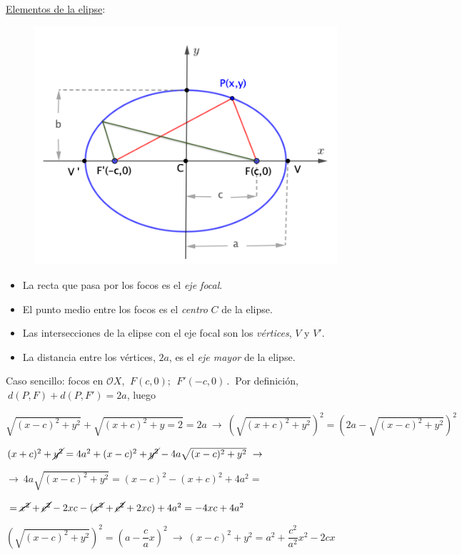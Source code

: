\vspace{4mm}
\begin{multicols}{2}
\underline{Elementos de la elipse}:
\begin{figure}[H]
	\centering
	\includegraphics[width=.5\textwidth]{img-conicas/conicas06.png}
	\end{figure}	
	\begin{itemize}
	\item La recta que pasa por los focos es el \emph{eje focal}.
	 

	\item El punto medio entre los focos es el \emph{centro} $C$ de la elipse.

	\item Las intersecciones de la elipse con el eje focal son los \emph{vértices}, $V$ y $V'$. 

	\item La distancia entre los vértices, $2a$, es el \emph{eje mayor} de la elipse.
	\end{itemize}
\end{multicols}

\vspace{4mm}

Caso sencillo: focos en $\mathcal OX$, $\ F(c,0);\ \ F'(-c,0)\, . \ $ Por definición, $\ d(P,F)+d(P,F')=2a$, luego

$\sqrt{(x-c)^2+y^2}+\sqrt{(x+c)^2+y=2}=2a \ \to \ (\sqrt{(x+c)^2+y^2})^2=(2a-\sqrt{(x-c)^2+y^2})^2$

$(x+c)^2 + \cancel{y^2} = 4a^2 + (x-c)^2 +\cancel{y^2} -4a\sqrt{(x-c)^2+y^2} \ \to \ $

$\to \ 4a\sqrt{(x-c)^2+y^2}=(x-c)^2-(x+c)^2+4a^2 =$ 

\hspace{35mm} $\, =\cancel{x^2}+\cancel{c^2}-2xc-(\cancel{x^2}+\cancel{c^2}+2xc)+4a^2=-4xc+4a^2$

$\left( \sqrt{(x-c)^2+y^2}\right)^2=\left( a-\dfrac c a x \right)^2 \ \to \ (x-c)^2+y^2=a^2+\dfrac{c^2}{a^2}x^2-2cx$

